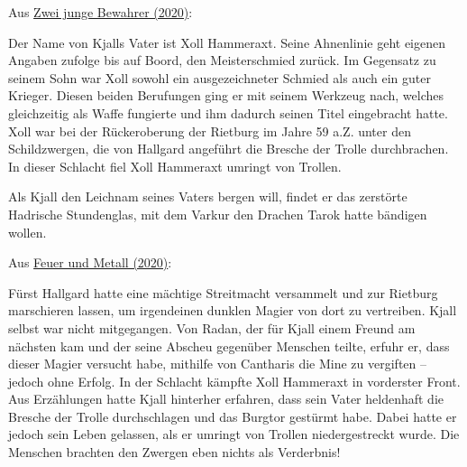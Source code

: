 \documentclass[10pt, a4paper, oneside]{book}
\newcommand{\refstorytext}[1]{\hyperref[Storytext: #1]{#1}}
\begin{document}
\begin{multicols}{2}
\begin{center}
    Aus \refstorytext{Zwei junge Bewahrer (2020)}:
\end{center}

Der Name von Kjalls Vater ist Xoll Hammeraxt. Seine Ahnenlinie geht eigenen Angaben zufolge bis auf Boord, den Meisterschmied zurück. Im Gegensatz zu seinem Sohn war Xoll sowohl ein ausgezeichneter Schmied als auch ein guter Krieger. Diesen beiden Berufungen ging er mit seinem Werkzeug nach, welches gleichzeitig als Waffe fungierte und ihm dadurch seinen Titel eingebracht hatte. Xoll war bei der Rückeroberung der Rietburg im Jahre 59 a.Z. unter den Schildzwergen, die von Hallgard angeführt die Bresche der Trolle durchbrachen. In dieser Schlacht fiel Xoll Hammeraxt umringt von Trollen.

Als Kjall den Leichnam seines Vaters bergen will, findet er das zerstörte Hadrische Stundenglas, mit dem Varkur den Drachen Tarok hatte bändigen wollen.


\begin{center}
    Aus \refstorytext{Feuer und Metall (2020)}:
\end{center}

Fürst Hallgard hatte eine mächtige Streitmacht versammelt und zur Rietburg marschieren lassen, um irgendeinen dunklen Magier von dort zu vertreiben. Kjall selbst war nicht mitgegangen. Von Radan, der für Kjall einem Freund am nächsten kam und der seine Abscheu gegenüber Menschen teilte, erfuhr er, dass dieser Magier versucht habe, mithilfe von Cantharis die Mine zu vergiften – jedoch ohne Erfolg. In der Schlacht kämpfte Xoll Hammeraxt in vorderster Front. Aus Erzählungen hatte Kjall hinterher erfahren, dass sein Vater heldenhaft die Bresche der Trolle durchschlagen und das Burgtor gestürmt habe. Dabei hatte er jedoch sein Leben gelassen, als er umringt von Trollen niedergestreckt wurde. Die Menschen brachten den Zwergen eben nichts als Verderbnis!\bigskip


\end{multicols}
\end{document}
